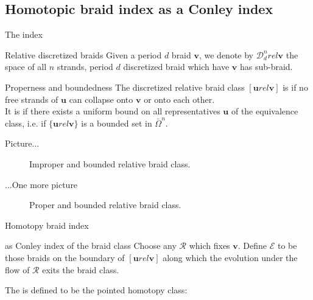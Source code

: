 \documentclass[9pt, english]{beamer}
\theoremstyle{definition}
\newcommand{\simbolovettore}[1]{{\boldsymbol{#1}}}
\newcommand{\vh}{\simbolovettore{h}}
\newcommand{\vu}{\simbolovettore{u}}
\newcommand{\vv}{\simbolovettore{v}}
\begin{document}
\subsection{Homotopic braid index as a Conley index}
\begin{frame}{The index}
    \begin{block}{Relative discretized braids}
        Given a period $d$ braid $\vv$, we denote by $\mathscr D_d^n
        rel\vv$ the space of all $n$ strands, period $d$ discretized braid
        which have $\vv$ has sub-braid.
        \end{block}\pause
    \begin{block}{Properness and boundedness}\pause
        The discretized relative braid class $[\vu rel \vv]$ is {\color{red}{proper}\/}
        if no free strands of $\vu$ can collapse onto $\vv$ or onto each
        other.\pause \\
        It is {\color{red}{bounded}\/} if there exists a uniform bound on all
        representatives $\vu$ of the equivalence class, i.e. if $\{\vu
        rel \vv\}$ is a bounded set in $\bar \Omega^n$.
    \end{block}
\end{frame}
\begin{frame}{Picture...}
\begin{figure}\label{fig:improper_Bounded}
        \caption{Improper and bounded relative braid class.}
        \end{figure}
\end{frame}
\begin{frame}{...One more picture}
\begin{figure}\label{fig:proper_Bounded}
        \caption{Proper and bounded relative braid class.}
        \end{figure}
\end{frame}
\begin{frame}{Homotopy braid index}\pause
    \begin{block}{as Conley index of the braid class}\pause
        Choose any $\mathscr R$ which fixes $\vv$. Define $\mathscr E$
        to be those braids on the boundary of $[\vu rel \vv]$ along
        which the evolution under the flow of $\mathscr R$ exits the
        braid class.\pause

        The {\color{red}{homotopy braid index}\/} is defined to be the pointed homotopy
        class:\pause
        {\color{green}{
        \[
        \vh([\vu rel\vv]):=([\vu rel \vv]/\mathscr E, \{\mathscr E\}).
        \]}\/}
    \end{block}
\end{frame}
\end{document}
